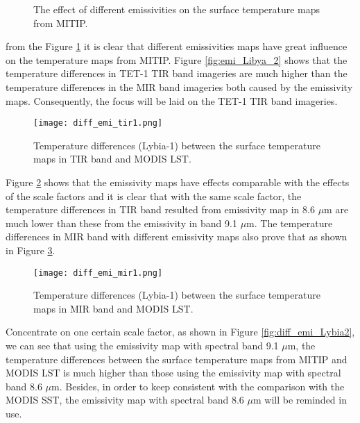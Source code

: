 \begin{figure}[!htbp]
\centering
{}
\hspace{0.5in}
\caption{The effect of different emissivities on the surface temperature maps from MITIP.}
\label{fig:diff_emi_Lybia}
\end{figure}

\noindent from the Figure \ref{fig:diff_emi_Lybia} it is clear that different emissivities maps have great influence on the temperature maps from MITIP.  Figure \ref{fig:emi_Libya_2} shows that the temperature differences in TET-1 TIR band imageries are much higher than the temperature differences in the MIR band imageries both caused by the emissivity maps. Consequently, the focus will be laid on the TET-1 TIR band imageries.\\

\begin{figure}[!htbp]
\centering
\texttt{[image: diff\_emi\_tir1.png]}
\caption{Temperature differences (Lybia-1) between the surface temperature maps in TIR band and MODIS LST.}
\label{fig:diff_emi_tir1}
\end{figure}

\noindent Figure \ref{fig:diff_emi_tir1} shows that the emissivity maps have effects comparable with the effects of the scale factors and it is clear that with the same scale factor, the temperature differences in TIR band resulted from emissivity map in 8.6 $\mu$m are much lower than these from the emissivity in band 9.1 $\mu$m. The temperature differences in MIR band with different emissivity maps also prove that as shown in Figure \ref{fig:diff_emi_mir1}.\\

\begin{figure}[!htbp]
\centering
\texttt{[image: diff\_emi\_mir1.png]}
\caption{Temperature differences (Lybia-1) between the surface temperature maps in MIR band and MODIS LST.}
\label{fig:diff_emi_mir1}
\end{figure}

\noindent Concentrate on one certain scale factor, as shown in Figure \ref{fig:diff_emi_Lybia2}, we can see that using the emissivity map with spectral band 9.1 $\mu$m, the temperature differences between the surface temperature maps from MITIP and MODIS LST is much higher than those using the emissivity map with spectral band 8.6 $\mu$m. Besides, in order to keep consistent with the comparison with the MODIS SST, the emissivity map with spectral band 8.6 $\mu$m will be reminded in use.\\

